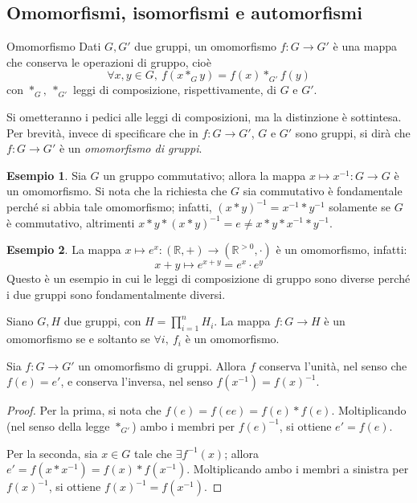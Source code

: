 \documentclass[11pt, a4paper]{scrartcl}
\theoremstyle{definition}
\newtheorem{esempio}{Esempio}
\numberwithin{esempio}{section}
\theoremstyle{definition}
\numberwithin{obs}{section}
\numberwithin{nota}{section}
\numberwithin{equation}{subsection}
\begin{document}
\subsection{Omomorfismi, isomorfismi e automorfismi}
\begin{definizione}
	{Omomorfismo}{}
	Dati $G,G'$ due gruppi, un omomorfismo $f: G \to G'$ \`e una mappa che conserva le operazioni di gruppo, cio\`e
	\[
	\forall  x,y \in G, \ f(x*_G y ) = f(x) *_{G'} f(y)
	\] 
	con $*_G, \ *_{G'} $ leggi di composizione, rispettivamente, di $G$ e $G'$.
\end{definizione}
\noindent Si ometteranno i pedici alle leggi di composizioni, ma la distinzione \`e sottintesa.
Per brevit\`a, invece di specificare che in $f:G \to G'$, $G$ e $G'$ sono gruppi, si dir\`a che $f:G\to G'$ \`e un \textit{omomorfismo di gruppi}.
\begin{esempio}
Sia $G$ un gruppo commutativo; allora la mappa $x \mapsto x^{-1} : G \to G $ \`e un omomorfismo. 
Si nota che la richiesta che $G$ sia commutativo \`e fondamentale perch\'e si abbia tale omomorfismo; infatti, $ (x*y)^{-1} = x ^{-1}*y^{-1} $ solamente se $G$ \`e commutativo, altrimenti $x*y *(x*y)^{-1} = e \neq x*y *x^{-1} *y^{-1} $.
\end{esempio}
\begin{esempio}
 La mappa $x\mapsto e^x : (\mathbb{R}, +) \to (\mathbb{R}^{>0} , \cdot )$ \`e un omomorfismo, infatti:
 \[
 x + y \mapsto e^{x+y} = e^x \cdot e^y
 \] 
Questo \`e un esempio in cui le leggi di composizione di gruppo sono diverse perch\'e i due gruppi sono fondamentalmente diversi. 
\end{esempio}
\begin{prop}
	{}{}
	Siano $G,H$ due gruppi, con $H = \prod_{i=1}^n  H_i$. La mappa $f : G \to H $ \`e un omomorfismo se e soltanto se $\forall i, \ f_i$ \`e un omomorfismo.
\end{prop}
\begin{prop}
	{}{}
	Sia $f:G \to G'$ un omomorfismo di gruppi. Allora $f$ conserva l'unit\`a, nel senso che $f(e) = e' $, e conserva l'inversa, nel senso $f(x^{-1} ) = f(x)^{-1} $.
	\begin{proof}
		Per la prima, si nota che $f(e) = f(ee) = f(e)*f(e)$. Moltiplicando (nel senso della legge $*_{G'} $) ambo i membri per $f(e)^{-1} $, si ottiene $e' = f(e)$.

		Per la seconda, sia $x \in G$ tale che $\exists f^{-1} (x)$; allora $e' = f(x*x^{-1} )= f(x) * f(x^{-1} )$. Moltiplicando ambo i membri a sinistra per $f (x)^{-1} $, si ottiene $f (x) ^{-1} = f(x^{-1} )$.
	\end{proof}
\end{prop}
\end{document}
